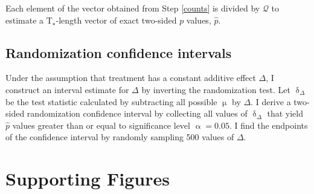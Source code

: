 Each element of the vector obtained from Step \ref{counts} is divided by $\mathcal{Q}$ to estimate a $\text{T}_\star$-length vector of exact two-sided $p$ values, $\hat{p}$. 

\subsection{Randomization confidence intervals}

Under the assumption that treatment has a constant additive effect $\Delta$, I construct an interval estimate for $\Delta$ by inverting the randomization test. Let $\updelta_\Delta$ be the test statistic calculated by subtracting all possible $\upmu$ by $\Delta$. I derive a two-sided randomization confidence interval by collecting all values of $\updelta_\Delta$ that yield $\hat{p}$ values greater than or equal to significance level $\upalpha=0.05$. I find the endpoints of the confidence interval by randomly sampling 500 values of $\Delta$.

\clearpage
\section{Supporting Figures}

